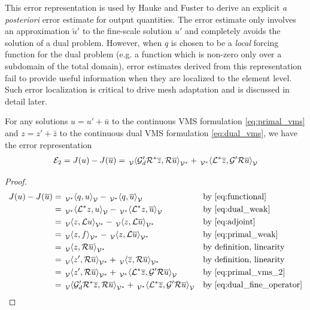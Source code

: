 This error representation is used by Hauke and Fuster
\cite{hauke2009variational} to derive an explicit
\emph{a posteriori} error estimate for output quantities.
The error estimate only involves an approximation
$\tilde{u}'$ to the fine-scale solution $u'$ and
completely avoids the solution of a dual problem.
However, when $q$ is chosen to be a \emph{local}
forcing function for the dual problem (e.g. a function
which is non-zero only over a subdomain of the total
domain), error estimates derived from this
representation fail to provide useful information
when they are localized to the element level.
Such error localization is critical to drive
mesh adaptation and is discussed in detail later.

\begin{prop}
For any solutions $u = u' + \bar{u}$ to the continuous VMS
formulation \eqref{eq:primal_vms} and $z = z' + \bar{z}$ to the
continuous dual VMS formulation \eqref{eq:dual_vms}, we have the
error representation
%
\begin{gather}
\mathcal{E}_2 = J(u) - J(\overline{u}) =
\,{}_{\mathcal{V}}^{}\!\left< {\mathcal{G}'_d \mathcal{R}^* \overline{z}}, { \mathcal{R} \overline{u}} \right>_{\mathcal{V}^*} +
\,{}_{\mathcal{V}^*}^{}\!\left< {\mathcal{L}^* \overline{z}}, {\mathcal{G}' \mathcal{R} \overline{u}} \right>_{\mathcal{V}}
\label{eq:error_cont_1}
\end{gather}
%
\end{prop}

\begin{proof}
%
\begin{gather*}
\begin{aligned}
J(u) - J(\bar{u}) &=
\paira{q}{u} - \paira{q}{\bar{u}}
&& \text{by \eqref{eq:functional}} \\
&= \paira{\OP^* z}{u} - \paira{\OP^* z}{\bar{u}}
&& \text{by \eqref{eq:dual_weak}} \\
&= \pairb{z}{\OP u} - \pairb{z}{\OP \bar{u}}
&& \text{by \eqref{eq:adjoint}} \\
&= \pairb{z}{f} - \pairb{z}{\OP \bar{u}}
&& \text{by \eqref{eq:primal_weak}} \\
&= \pairb{z}{\R \bar{u}}
&& \text{by definition, linearity} \\
&= \pairb{z'}{\R \bar{u}} + \pairb{\bar{z}}{\R \bar{u}}
&& \text{by definition, linearity} \\
&= \pairb{z'}{\R \bar{u}} + \paira{\OP^* \bar{z}}{\G' \R \bar{u}}
&& \text{by \eqref{eq:primal_vms_2}} \\
&= \pairb{\G'_d \R^* \bar{z}}{\R \bar{u}} +
\paira{\OP^* \bar{z}}{\G' \R \bar{u}}
&& \text{by \eqref{eq:dual_fine_operator}}
\end{aligned}
\label{eq:error_cont_2}
\end{gather*}
\end{proof}

